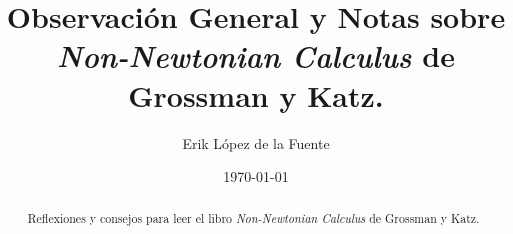 \documentclass[a4paper, titlepage]{article}
\title{Observación General y Notas sobre \textit{Non-Newtonian Calculus} de Grossman y Katz.}
\author{Erik López de la Fuente}
\date{\today}
\begin{document}
\maketitle

\begin{abstract}
	Reflexiones y consejos para leer el libro \textit{Non-Newtonian Calculus} de Grossman y Katz.
\end{abstract}

\tableofcontents
\newpage




\end{document}

